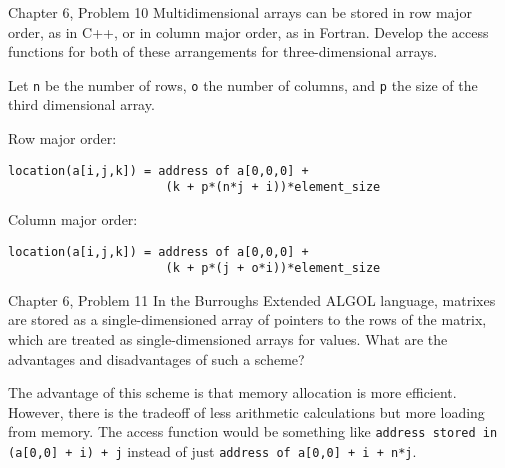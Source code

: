 \documentclass[11pt]{article}
\begin{document}
\begin{ps}
\begin{problemcit}{Chapter 6, Problem 10}
Multidimensional arrays can be stored in row major order, as in C++, or in column major order, as in Fortran. Develop the access functions for both of these arrangements for three-dimensional arrays.
\end{problemcit}

\begin{soln}
Let \verb|n| be the number of rows, \verb|o| the number of columns, and \verb|p| the size of the third dimensional array.

Row major order:
\begin{verbatim}
location(a[i,j,k]) = address of a[0,0,0] +
                      (k + p*(n*j + i))*element_size
\end{verbatim}

Column major order:
\begin{verbatim}
location(a[i,j,k]) = address of a[0,0,0] +
                      (k + p*(j + o*i))*element_size
\end{verbatim}
\end{soln}
\end{ps}

\begin{ps}
\begin{problemcit}{Chapter 6, Problem 11}
In the Burroughs Extended ALGOL language, matrixes are stored as a single-dimensioned array of pointers to the rows of the matrix, which are treated as single-dimensioned arrays for values. What are the advantages and disadvantages of such a scheme?
\end{problemcit}

\begin{soln}
The advantage of this scheme is that memory allocation is more efficient. However, there is the tradeoff of less arithmetic calculations but more loading from memory. The access function would be something like \verb|address stored in (a[0,0] + i) + j| instead of just \verb|address of a[0,0] + i + n*j|.
\end{soln}
\end{ps}
\end{document}
